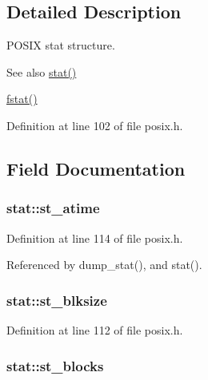 \subsection{Detailed Description}
P\+O\+S\+IX stat structure. 

\begin{DoxySeeAlso}{See also}
\hyperlink{posix_8c_abef70bf7a4af8a1f4998db0035c51781}{stat()} 

\hyperlink{posix_8h_a85e86e70773c0a204346f965272bd364}{fstat()} 
\end{DoxySeeAlso}


Definition at line 102 of file posix.\+h.



\subsection{Field Documentation}
\subsubsection[{\texorpdfstring{st\+\_\+atime}{st_atime}}]{ stat\+::st\+\_\+atime}\hypertarget{structstat_ab74d1e7e345e88b9d0fb2688a97cba64}{}\label{structstat_ab74d1e7e345e88b9d0fb2688a97cba64}


Definition at line 114 of file posix.\+h.



Referenced by dump\+\_\+stat(), and stat().

\subsubsection[{\texorpdfstring{st\+\_\+blksize}{st_blksize}}]{ stat\+::st\+\_\+blksize}\hypertarget{structstat_a38d474e1ae3cf6fbdde89ac3c3e308f1}{}\label{structstat_a38d474e1ae3cf6fbdde89ac3c3e308f1}


Definition at line 112 of file posix.\+h.

\subsubsection[{\texorpdfstring{st\+\_\+blocks}{st_blocks}}]{ stat\+::st\+\_\+blocks}\hypertarget{structstat_a42dd716b2f9234f961d949fc9500eefb}{}\label{structstat_a42dd716b2f9234f961d949fc9500eefb}


